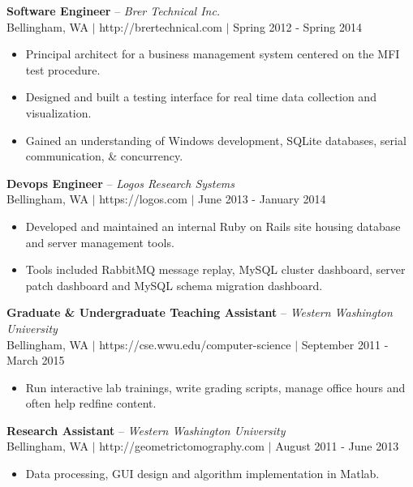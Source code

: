 \documentclass[line,margin]{res}
\begin{document}
\begin{resume}
    {\bf Software Engineer} -- {\sl Brer Technical Inc.} \\
    {\footnotesize Bellingham, WA $|$ http://brertechnical.com $|$ Spring 2012 - Spring 2014}
    \begin{itemize} \itemsep -1pt
        \item Principal architect for a business management system centered on the MFI test procedure.
        \item Designed and built a testing interface for real time data collection and visualization.
        \item Gained an understanding of Windows development, SQLite databases, serial communication, \& concurrency.
    \end{itemize}

    {\bf Devops Engineer} -- {\sl Logos Research Systems} \\
    {\footnotesize Bellingham, WA $|$ https://logos.com $|$ June 2013 - January 2014}
    \begin{itemize} \itemsep -1pt
        \item Developed and maintained an internal Ruby on Rails site housing database and server management tools.
        \item Tools included RabbitMQ message replay, MySQL cluster dashboard, server patch dashboard and MySQL schema migration dashboard.
    \end{itemize}

    {\bf Graduate \& Undergraduate Teaching Assistant} -- {\sl Western Washington University} \\
    {\footnotesize Bellingham, WA $|$ https://cse.wwu.edu/computer-science $|$ September 2011 - March 2015}
    \begin{itemize} \itemsep -1pt
      \item Run interactive lab trainings, write grading scripts, manage office hours and often help redfine content.
    \end{itemize}

    {\bf Research Assistant} -- {\sl Western Washington University} \\
    {\footnotesize Bellingham, WA $|$ http://geometrictomography.com $|$ August 2011 - June 2013}
    \begin{itemize}  \itemsep -1pt
        \item Data processing, GUI design and algorithm implementation in Matlab.
    \end{itemize}


\end{resume}
\end{document}
